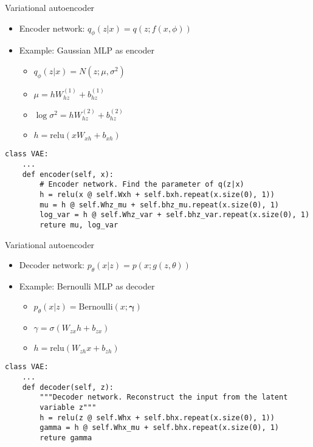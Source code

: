 \documentclass{beamer}
\newcommand{\bernoulli}{\mathrm{Bernoulli}}
\newcommand{\relu}{\mathrm{relu}}
\begin{document}
\begin{frame}[fragile]{Variational autoencoder}
\begin{itemize}
	\item Encoder network: $q_\phi(z|x)=q(z;f(x,\phi))$
	\item Example: Gaussian MLP as encoder
	\begin{itemize}
		\item $q_\phi(z|x)=N(z;\mu, \sigma^2)$
		\item $\mu = h W^{(1)}_{hz}+b^{(1)}_{hz}$
		\item $\log \sigma^2 = h W^{(2)}_{hz}+b^{(2)}_{hz}$
		\item $h = \relu\left(x W_{xh}+b_{xh}\right)$
	\end{itemize}
\end{itemize}
\begin{verbatim}
class VAE:
    ...
    def encoder(self, x):
        # Encoder network. Find the parameter of q(z|x)
        h = relu(x @ self.Wxh + self.bxh.repeat(x.size(0), 1))  
        mu = h @ self.Whz_mu + self.bhz_mu.repeat(x.size(0), 1)      
        log_var = h @ self.Whz_var + self.bhz_var.repeat(x.size(0), 1)
        reture mu, log_var
\end{verbatim}
\end{frame}

\begin{frame}[fragile]{Variational autoencoder}
\begin{itemize}
	\item Decoder network: $p_\theta(x|z)=p(x;g(z,\theta))$
	\item Example: Bernoulli MLP as decoder
	\begin{itemize}
		\item $p_\theta(x|z)=\bernoulli(x;\bm{\gamma})$
		\item $\gamma = \sigma\left(W_{zx}h+b_{zx}\right)$
		\item $h = \relu\left(W_{zh}x+b_{zh}\right)$
	\end{itemize}
\end{itemize}
\begin{verbatim}
class VAE:
    ...
    def decoder(self, z):
        """Decoder network. Reconstruct the input from the latent 
    	variable z"""
        h = relu(z @ self.Whx + self.bhx.repeat(x.size(0), 1))  
        gamma = h @ self.Whx_mu + self.bhx.repeat(x.size(0), 1)      
        reture gamma
\end{verbatim}
\end{frame}
\end{document}
